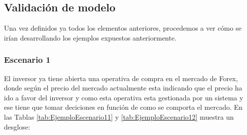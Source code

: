 \subsection{Validación de modelo}

Una vez definidos ya todos los elementos anteriores, procedemos a ver cómo se irían desarrollando los ejemplos expuestos anteriormente.

\subsubsection{Escenario 1}
El inversor ya tiene abierta una operativa de compra en el mercado de Forex, donde según el precio del mercado actualmente esta indicando que el precio ha ido a favor del inversor y como esta operativa esta gestionada por un sistema y ese tiene que tomar deciciones en función de como se comporta el mercado. En las Tablas \ref{tab:EjemploEscenario11} y \ref{tab:EjemploEscenario12} muestra un desglose:

